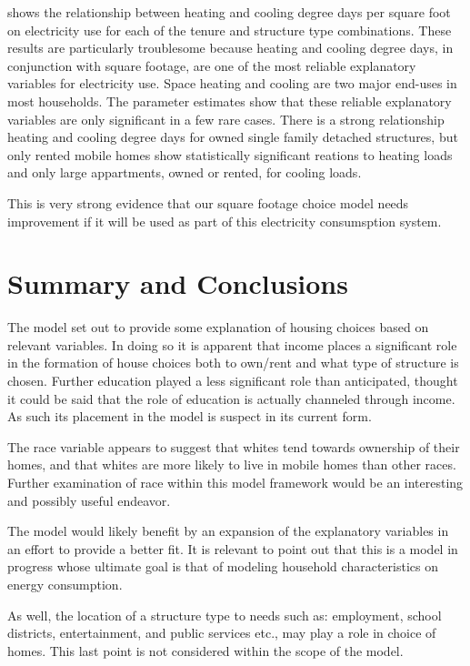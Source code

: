 \documentclass{article}
\begin{document}
shows the relationship between heating and cooling degree days per square foot on electricity use for each of the tenure and structure type combinations.  These results are particularly troublesome because heating and cooling degree days, in conjunction with square footage, are one of the most reliable explanatory variables for electricity use.  Space heating and cooling are two major end-uses in most households.  The parameter estimates show that these reliable explanatory variables are only significant in a few rare cases.  There is a strong relationship heating and cooling degree days for owned single family detached structures, but only rented mobile homes show statistically significant reations to heating loads and only large appartments, owned or rented, for cooling loads.

This is very strong evidence that our square footage choice model needs improvement if it will be used as part of this electricity consumsption system. 

\section{Summary and Conclusions}

The model set out to provide some explanation of housing choices based on relevant variables.  In doing so it is apparent that income places a significant role in the formation of house choices both to own/rent and what type of structure is chosen.  Further education played a less significant role than anticipated, thought it could be said that the role of education is actually channeled through income.  As such its placement in the model is suspect in its current form.

The race variable appears to suggest that whites tend towards ownership of their homes, and that whites are more likely to live in mobile homes than other races.  Further examination of race within this model framework would be an interesting and possibly useful endeavor. 

The model would likely benefit by an expansion of the explanatory variables in an effort to provide a better fit.  It is relevant to point out that this is a model in progress whose ultimate goal is that of modeling household characteristics on energy consumption.


As well, the location of a structure type to needs such as: employment, school districts, entertainment, and public services etc., may play a role in choice of homes.  This last point is not considered within the scope of the model.  
\end{document}
